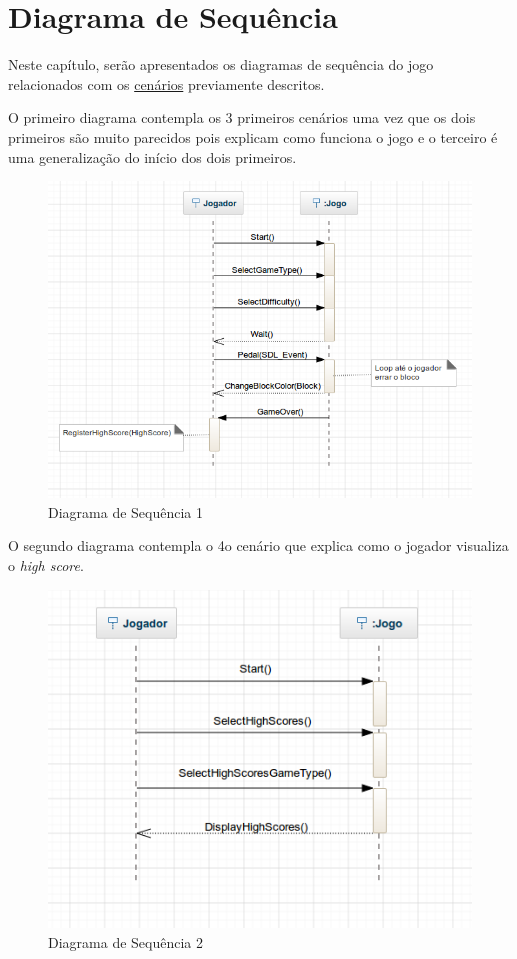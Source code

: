 \chapter[Diagrama de Sequência]{Diagrama de Sequência}

Neste capítulo, serão apresentados os diagramas de sequência do jogo relacionados com os \hyperlink{cenarios}{cenários} previamente descritos.

O primeiro diagrama contempla os 3 primeiros cenários uma vez que os dois primeiros são muito parecidos pois explicam como funciona o jogo e o terceiro é uma generalização do início dos dois primeiros. 

\begin{figure}[H]
\centering\includegraphics[scale=0.5]{figuras/SequenceDiagram1.png}
\caption{Diagrama de Sequência 1}
\end{figure}

O segundo diagrama contempla o 4o cenário que explica como o jogador visualiza o \textit{high score}.

\begin{figure}[H]
\centering\includegraphics[scale=0.5]{figuras/SequenceDiagram2.png}
\caption{Diagrama de Sequência 2}
\end{figure}

